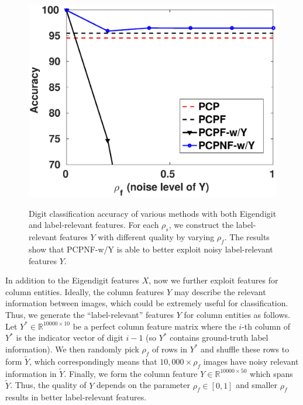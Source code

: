 \documentclass[twoside,11pt]{article}
\def\R{\mathbb{R}}
\begin{document}
\begin{figure}[t]
{    \includegraphics[width=0.32\linewidth]{figs/svm_digit_rhos_02.eps}
    \label{fig:svm_digit_rhos_02}}
    \caption{Digit classification accuracy of various methods with both Eigendigit and label-relevant features.
    For each $\rho_s$, we construct the label-relevant features $Y$ with different quality by varying $\rho_f$.
    The results show that PCPNF-w/Y is able to better exploit noisy label-relevant features $Y$.}
  \label{fig:digit_exp_pcpgf}
\end{figure}
In addition to the Eigendigit features $X$, now we further exploit features for column entities.
Ideally, the column features $Y$ may describe the relevant information between images, which could be
extremely useful for classification.  Thus, we generate the ``label-relevant'' features $Y$ for column entities
as follows.
Let $Y^* \in \R^{10000\times 10}$ be a perfect column feature matrix where the
$i$-th column of $Y^*$ is the indicator vector of digit $i-1$ (so $Y^*$ contains
ground-truth label information).
We then randomly pick $\rho_f$ of rows in $Y^*$ and shuffle
these rows to form $\tilde{Y}$, which correspondingly means that $10,000\times\rho_f$ images
have noisy relevant information in $\tilde{Y}$.  Finally, we form the column feature
$Y \in \R^{10000\times 50}$ which spans $\tilde{Y}$.  Thus, the quality of $Y$ depends on the parameter
$\rho_f \in [0, 1]$ and smaller $\rho_f$ results in better label-relevant features.
\end{document}
